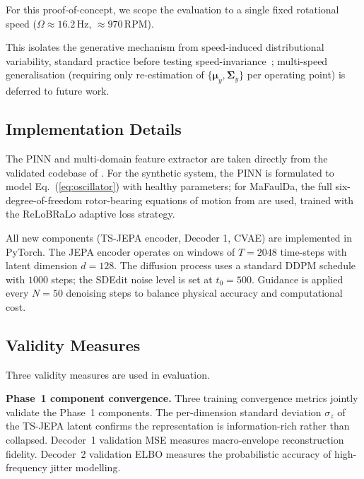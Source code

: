 \documentclass[conference]{IEEEtran}
\newcommand{\muvec}{\boldsymbol{\mu}}
\newcommand{\Sigmamat}{\boldsymbol{\Sigma}}
\begin{document}
For this proof-of-concept, we scope the evaluation to a single fixed rotational speed ($\Omega\approx16.2$\,Hz, $\approx970$\,RPM).

This isolates the generative mechanism from speed-induced distributional variability, standard practice before testing speed-invariance~\cite{spotorno2026linking}; multi-speed generalisation (requiring only re-estimation of $\{\muvec_y,\Sigmamat_y\}$ per operating point) is deferred to future work.

\subsection{Implementation Details}

The PINN and multi-domain feature extractor are taken directly from the validated codebase of \cite{spotorno2026linking}. For the synthetic system, the PINN is formulated to model Eq.~(\ref{eq:oscillator}) with healthy parameters; for MaFaulDa, the full six-degree-of-freedom rotor-bearing equations of motion from \cite{spotorno2026linking} are used, trained with the ReLoBRaLo adaptive loss strategy.

All new components (TS-JEPA encoder, Decoder 1, CVAE) are implemented in PyTorch. The JEPA encoder operates on windows of $T=2048$ time-steps with latent dimension $d=128$. The diffusion process uses a standard DDPM schedule with $1000$ steps; the SDEdit noise level is set at $t_0=500$. Guidance is applied every $N=50$ denoising steps to balance physical accuracy and computational cost.

\subsection{Validity Measures}

Three validity measures are used in evaluation.

\textbf{Phase~1 component convergence.}
Three training convergence metrics jointly validate the Phase~1 components.
The per-dimension standard deviation $\sigma_z$ of the TS-JEPA latent confirms the representation is information-rich rather than collapsed.
Decoder~1 validation MSE measures macro-envelope reconstruction fidelity.
Decoder~2 validation ELBO measures the probabilistic accuracy of high-frequency jitter modelling.
\end{document}
